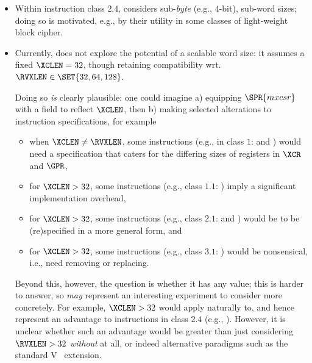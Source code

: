 \begin{description}
      \begin{itemize}
      \item Within instruction class $2.4$, \XCID considers sub-{\em byte} 
            (e.g., $4$-bit), sub-word sizes; doing so is motivated, e.g., 
            by their utility in some classes of light-weight block cipher.  

      \item Currently, \XCID does not explore the potential of a scalable 
            word size: it assumes a fixed $\XCLEN = 32$, though retaining
            compatibility wrt. $\RVXLEN \in \SET{ 32, 64, 128 }$.

            Doing so {\em is} clearly plausible: one could imagine
            a) equipping $\SPR{mxcsr}$ with a field to reflect $\XCLEN$,
               then
            b) making selected alterations to instruction specifications,
               for example

            \begin{itemize}
            \item when $\XCLEN \neq \RVXLEN$, 
                  some instructions
                  (e.g., in class $1$:    and )
                  would need a specification that caters for the differing 
                  sizes of registers in $\XCR$ and $\GPR$,
            \item for $\XCLEN > 32$, 
                  some instructions
                  (e.g., class $1.1$: )
                  imply a significant implementation overhead,
            \item for $\XCLEN > 32$, 
                  some instructions
                  (e.g., class $2.1$:  and )
                  would be to be (re)specified in a more general form,
                  and
            \item for $\XCLEN > 32$, 
                  some instructions
                  (e.g., class $3.1$: )
                  would be nonsensical, i.e., need removing or replacing.
            \end{itemize}

            \noindent
            Beyond this, however, the question is whether it has any value;
            this is harder to answer, so {\em may} represent an interesting 
            experiment to consider more concretely.
            For example, $\XCLEN > 32$ would apply naturally to, and hence
            represent an advantage to instructions in class $2.4$ (e.g.,
            ).  However, it is unclear whether such an
            advantage would be greater than just considering $\RVXLEN > 32$
            {\em without} \XCID at all, or indeed alternative paradigms 
            such as the standard V~\cite[Section 17]{SCARV:RV:ISA:I:17} 
            extension.


\end{itemize}
\end{description}
